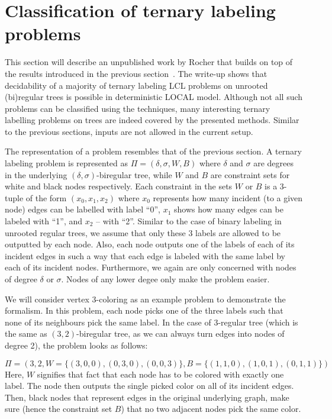 \section{Classification of ternary labeling problems}

This section will describe an unpublished work by Rocher that builds on top
of the results introduced in the previous section~\cite{Rocher2020doc, Rocher2020clas}.
The write-up shows that decidability of a majority of ternary labeling LCL problems on unrooted
(bi)regular trees is possible in deterministic LOCAL model. Although not all such problems
can be classified using the techniques, many interesting ternary labelling problems on trees
are indeed covered by the presented methods.
Similar to the previous sections, inputs are not allowed in the current setup.

The representation of a problem resembles that of the previous section. A
ternary labeling problem is represented as $\Pi = (\delta, \sigma, W, B)$
where $\delta$ and $\sigma$ are degrees in the underlying $(\delta, \sigma)$-biregular
tree, while $W$ and $B$ are constraint sets for white and black nodes respectively.
Each constraint in the sets $W$ or $B$ is a 3-tuple of the form $(x_0, x_1, x_2)$
where $x_0$ represents how many incident (to a given node) edges can be labelled with label ``0'',
$x_1$ shows how many edges can be labeled with ``1'', and $x_2$ -- with ``2''. Similar to the case
of binary labeling in unrooted regular trees, we assume that only these 3 labels are allowed to
be outputted by each node. Also, each node outputs one of the labels of each of its incident edges
in such a way that each edge is labeled with the same label by each of its incident nodes.
Furthermore, we again are only concerned with nodes of degree $\delta$ or $\sigma$. Nodes of
any lower degee only make the problem easier.

We will consider vertex 3-coloring as an example problem to demonstrate the formalism.
In this problem, each node picks one of the three labels such that none of its neighbours
pick the same label. In the case of 3-regular tree (which is the same as $(3, 2)$-biregular tree,
as we can always turn edges into nodes of degree 2), the problem looks as follows:

$$\Pi = (3, 2, W = \{ (3, 0, 0), (0, 3, 0), (0, 0, 3) \}, B = \{ (1, 1, 0), (1, 0, 1), (0, 1, 1) \})$$
Here, $W$ signifies that fact that each node has to be colored with exactly one label. The node then outputs
the single picked color on all of its incident edges. Then, black nodes that represent edges in the
original underlying graph, make sure (hence the constraint set $B$) that no two adjacent nodes
pick the same color.

